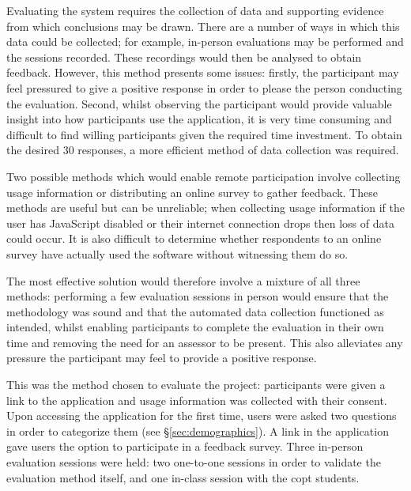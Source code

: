\documentclass[bsc,twoside,singlespacing,parskip,logo,notimes,normalheadings]{infthesis}
\begin{document}
    Evaluating the system requires the collection of data and
    supporting evidence from which conclusions may be drawn. There are
    a number of ways in which this data could be collected; for
    example, in-person evaluations may be performed and the sessions
    recorded. These recordings would then be analysed to obtain
    feedback. However, this method presents some issues: firstly, the
    participant may feel pressured to give a positive response in
    order to please the person conducting the evaluation. Second,
    whilst observing the participant would provide valuable insight
    into how participants use the application, it is very time
    consuming and difficult to find willing participants given the
    required time investment. To obtain the desired 30 responses, a
    more efficient method of data collection was required.

    Two possible methods which would enable remote participation
    involve collecting usage information or distributing an online
    survey to gather feedback. These methods are useful but can be
    unreliable; when collecting usage information if the user has
    JavaScript disabled or their internet connection drops then loss
    of data could occur. It is also difficult to determine whether
    respondents to an online survey have actually used the software
    without witnessing them do so.

    The most effective solution would therefore involve a mixture of
    all three methods: performing a few evaluation sessions in person
    would ensure that the methodology was sound and that the automated
    data collection functioned as intended, whilst enabling
    participants to complete the evaluation in their own time and
    removing the need for an assessor to be present. This also
    alleviates any pressure the participant may feel to provide a
    positive response.

    This was the method chosen to evaluate the project: participants
    were given a link to the application and usage information was
    collected with their consent. Upon accessing the application for
    the first time, users were asked two questions in order to
    categorize them (see \S\ref{sec:demographics}). A link in the
    application gave users the option to participate in a feedback
    survey. Three in-person evaluation sessions were held: two
    one-to-one sessions in order to validate the evaluation method
    itself, and one in-class session with the \gls{copt}
    students. 
\end{document}
